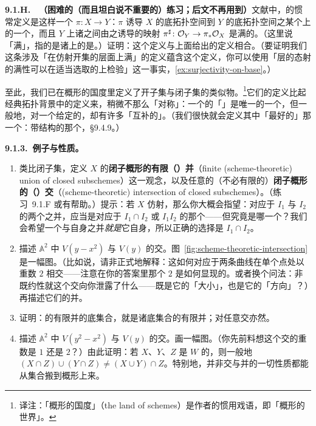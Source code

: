 \textbf{9.1.H.}\ \extrahard\ \textbf{（困难的（而且坦白说不重要的）练习；后文不再用到）}\quad 文献中，\trClosedEmbedding{}的惯常定义是这样一个\trMorphism{} $\pi\colon X\to Y$：$\pi$ 诱导 $X$ 的底拓扑空间到 $Y$ 的底拓扑空间之某个\trClosedSubset{}上的一个\trHomeomorphism，而且 $Y$ 上诸\trSheaf{}之间由之诱导的映射 $\pi^{\sharp}\colon\mathcal{O}_Y\to\pi_*\mathcal{O}_X$ 是满的。（这里说「满」，指的是诸\trStalk{}上的\trRingMorphism{}是\trSurjectiveMap。）证明：这个定义与上面给出的定义相合。（要证明我们这条涉及「在仿射开集的层面上满」的定义蕴含这个定义，你可以使用「层的态射的满性可以在适当选取的\trBase{}上检验」这一事实，\cref{ex:surjectivity-on-base}。）

至此，我们已在概形的国度里定义了开子集与闭子集的类似物。\footnote{译注：「概形的国度」（the land of schemes）是作者的惯用戏语，即「概形的世界」。}它们的定义比起经典拓扑背景中的定义来，稍微不那么「对称」：一个\trClosedSubscheme{}的「\trComplement」是唯一的一个\trOpenSubscheme，但一般地，对一个给定的\trOpenSubscheme，却有许多「互补的」\trClosedSubscheme。（我们很快就会定义其中「最好的」那一个：带\trReduced{}结构的那个，\S9.4.9。）

\textbf{9.1.3.\ 例子与性质。}

\begin{exercise}[重要练习]\label{ex:scheme-theoretic-union-intersection}
\begin{enumerate}[label=(\alph*)]
\item 类比闭子集，定义 $X$ 的\textbf{闭子概形的有限（\trSchemeTheoretic{}）并}（finite (scheme-theoretic) union of closed subschemes）这一观念，以及任意的（不必有限的）\textbf{闭子概形的（\trSchemeTheoretic{}）交}（(scheme-theoretic) intersection of closed subschemes）。（\mbox{练习~9.1.F} 或有帮助。）提示：若 $X$ 仿射，那么你大概会指望：对应于 $I_1$ 与 $I_2$ 的两个\trClosedSubscheme{}之并，应当是对应于 $I_1\cap I_2$ 或 $I_1I_2$ 的那个\trClosedSubscheme——但究竟是哪一个？我们会希望一个\trClosedSubscheme{}与自身之并\emph{就是}它自身，所以正确的选择是 $I_1\cap I_2$。
\item 描述 $\mathbb{A}^2$ 中 $V(y-x^2)$ 与 $V(y)$ 的\trSchemeTheoretic{}交。图~\ref{fig:scheme-theoretic-intersection} 是一幅图。（比如说，请非正式地解释：这如何对应于两条曲线在单个点处以重数 $2$ 相交——注意在你的答案里那个 $2$ 是如何显现的。或者换个问法：非既约性就这个交向你泄露了什么——既是它的「大小」，也是它的「方向」？）再描述它们的\trSchemeTheoretic{}并。
\item 证明：\trClosedSubscheme{}的有限并的底集合，就是诸底集合的有限并；对任意交亦然。
\item 描述 $\mathbb{A}^2$ 中 $V(y^2-x^2)$ 与 $V(y)$ 的\trSchemeTheoretic{}交。画一幅图。（你先前料想这个交的重数是 $1$ 还是 $2$？）由此证明：若 $X$、$Y$、$Z$ 是 $W$ 的\trClosedSubscheme，则一般地 $(X\cap Z)\cup(Y\cap Z)\neq(X\cup Y)\cap Z$。特别地，并非交与并的一切性质都能从集合搬到概形上来。
\end{enumerate}
\end{exercise}

